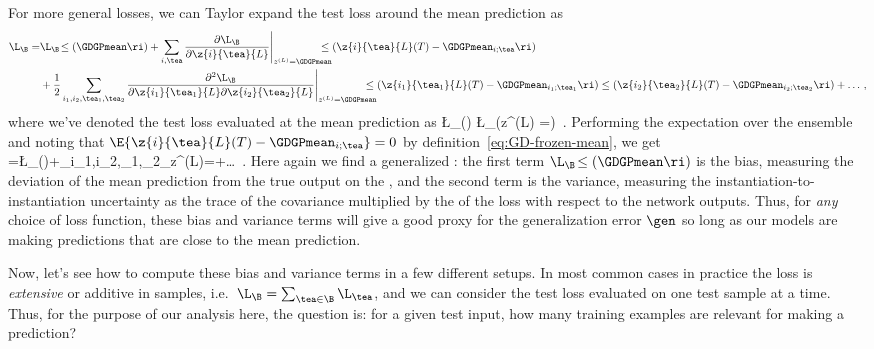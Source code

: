 For more general losses, we can Taylor expand the test loss around the mean prediction as
\begin{align}
\L_{\B}=&\L_{\B}\!\le(\GDGPmean\ri)+\sum_{i,\tea}\frac{\partial\L_{\B}}{\partial \z{i}{\tea}{L}}\Bigg\vert_{z^{(L)}=\GDGPmean}\!\!\!\!\!\!\!\!\le(\z{i}{\tea}{L}(T)-\GDGPmean_{i;\tea}\ri)\, \\
&+\frac{1}{2}\sum_{i_1,i_2,\tea_1,\tea_2}\frac{\partial^2\L_{\B}}{\partial \z{i_1}{\tea_1}{L}\partial \z{i_2}{\tea_2}{L}}\Bigg\vert_{z^{(L)}=\GDGPmean}\!\!\!\!\!\!\!\!\le(\z{i_1}{\tea_1}{L}(T)-\GDGPmean_{i_1;\tea_1}\ri)\le(\z{i_2}{\tea_2}{L}(T)-\GDGPmean_{i_2;\tea_2}\ri)+\ldots\, ,\notag
\end{align}
where we've denoted the test loss evaluated at the mean prediction as
\be\label{eq:general-loss-bias}
\L_{\B}\!\le(\GDGPmean\ri) \equiv \L_{\B}\!\le(z^{(L)} =\GDGPmean\ri)\, .
\ee 
Performing the expectation over the ensemble and noting that $\E{\z{i}{\tea}{L}(T)-\GDGPmean_{i;\tea}}=0$ by definition~\eqref{eq:GD-frozen-mean}, we get
\be\label{eq:bias-variance-decomposition-generalized-general-loss}
\E{\L_{\B}}=\L_{\B}\!\le(\GDGPmean\ri)+\sum_{i_1,i_2,\tea_1,\tea_2}\Bigg\vert_{z^{(L)}=\GDGPmean}\!\!\!\!\!\!\!\!+\ldots\, .
\ee
Here again we find a generalized : the first term $\L_{\B}\!\le(\GDGPmean\ri)$ is the bias, measuring the deviation of the mean prediction from the true output on the , and the second term is the variance, measuring the instantiation-to-instantiation uncertainty as the trace of the covariance multiplied by the  of the loss with respect to the network outputs. Thus, for \emph{any} choice of loss function, these bias and variance terms will give a good proxy for the generalization error $\gen$ so long as our models are making predictions that are close to the mean prediction.



Now, let's see how to compute these bias and variance terms in a few different setups.
In most common cases in practice
the loss is \emph{extensive} or additive in samples, i.e.~$\L_{\B}=\sum_{\tea\in\B}\L_{\tea}$, and we can consider the test loss evaluated on one test sample at a time.
Thus, for the purpose of our analysis here, the question is: for a given test input, how many training examples are relevant for making a prediction?


